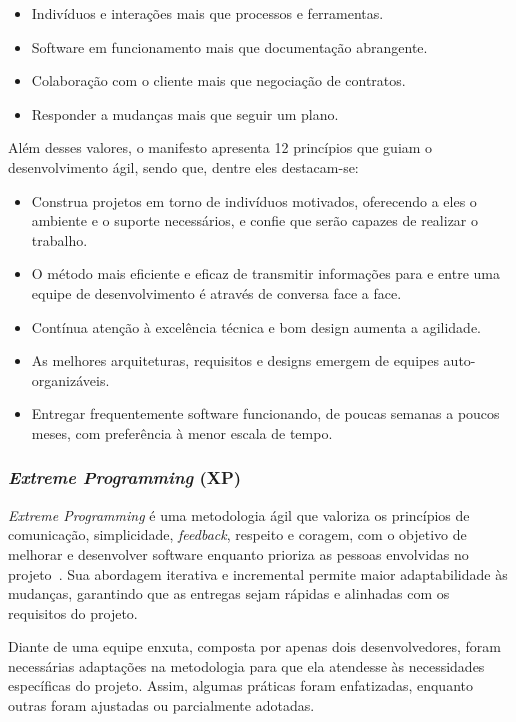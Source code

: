 \begin{itemize}
    \item Indivíduos e interações mais que processos e ferramentas.
    \item Software em funcionamento mais que documentação abrangente.
    \item Colaboração com o cliente mais que negociação de contratos.
    \item Responder a mudanças mais que seguir um plano.
\end{itemize}

Além desses valores, o manifesto apresenta 12 princípios que guiam o desenvolvimento ágil, sendo que, dentre eles destacam-se:

\begin{itemize}
    \item Construa projetos em torno de indivíduos motivados, oferecendo a eles o ambiente e o suporte necessários, e confie que serão capazes de realizar o trabalho.
    \item O método mais eficiente e eficaz de transmitir informações para e entre uma equipe de desenvolvimento é através de conversa face a face.
    \item Contínua atenção à excelência técnica e bom design aumenta a agilidade.
    \item As melhores arquiteturas, requisitos e designs emergem de equipes auto-organizáveis.
    \item Entregar frequentemente software funcionando, de poucas semanas a poucos meses, com preferência à menor escala de tempo.
\end{itemize}

\subsubsection{\textit{Extreme Programming} (XP)}

\textit{Extreme Programming} é uma metodologia ágil que valoriza os princípios de comunicação, simplicidade, \textit{feedback}, respeito e coragem, com o objetivo de melhorar e desenvolver software enquanto prioriza as pessoas envolvidas no projeto~\cite{extremeprogramming}. Sua abordagem iterativa e incremental permite maior adaptabilidade às mudanças, garantindo que as entregas sejam rápidas e alinhadas com os requisitos do projeto. 

Diante de uma equipe enxuta, composta por apenas dois desenvolvedores, foram necessárias adaptações na metodologia para que ela atendesse às necessidades específicas do projeto. Assim, algumas práticas foram enfatizadas, enquanto outras foram ajustadas ou parcialmente adotadas.

